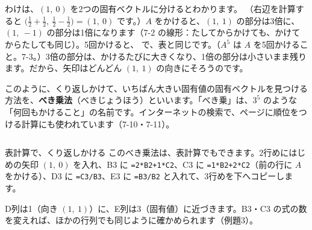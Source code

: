 わけは、$(1,\ 0)$ を2つの固有ベクトルに分けるとわかります。
（右辺を計算すると $\bigl(\tfrac12+\tfrac12,\ \tfrac12-\tfrac12\bigr)=(1,\ 0)$ です。）$A$ をかけると、$(1,\ 1)$ の部分は3倍に、$(1,\ -1)$ の部分は1倍になります（7-2 の線形：たしてからかけても、かけてからたしても同じ）。5回かけると、
で、表と同じです。（$A^5$ は $A$ を5回かけること。7-3。）3倍の部分は、かけるたびに大きくなり、1倍の部分は小さいまま残ります。だから、矢印はどんどん $(1,\ 1)$ の向きにそろうのです。

このように、くり返しかけて、いちばん大きい固有値の固有ベクトルを見つける方法を、\textbf{べき乗法}（べきじょうほう）といいます。「べき乗」は、$3^5$ のような「何回もかけること」の名前です。インターネットの検索で、ページに順位をつける計算にも使われています（7-10・7-11）。

\begin{column}{表計算で、くり返しかける}
このべき乗法は、表計算でもできます。2行めにはじめの矢印 $(1,\ 0)$ を入れ、B3 に \texttt{=2*B2+1*C2}、C3 に \texttt{=1*B2+2*C2}（前の行に $A$ をかける）、D3 に \texttt{=C3/B3}、E3 に \texttt{=B3/B2} と入れて、3行めを下へコピーします。
\begin{bkcenter}
\end{bkcenter}
D列は1（向き $(1,\ 1)$）に、E列は3（固有値）に近づきます。B3・C3 の式の数を変えれば、ほかの行列でも同じように確かめられます（例題3）。
\end{column}

